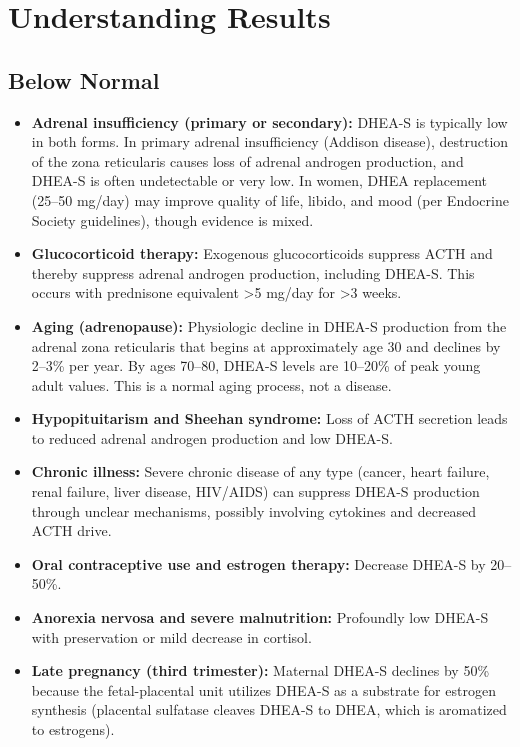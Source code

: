 \section*{Understanding Results}

\subsection*{Below Normal}
\begin{itemize}
  \item \textbf{Adrenal insufficiency (primary or secondary):} DHEA-S is typically low in both forms. In primary adrenal insufficiency (Addison disease), destruction of the zona reticularis causes loss of adrenal androgen production, and DHEA-S is often undetectable or very low. In women, DHEA replacement (25--50 mg/day) may improve quality of life, libido, and mood (per Endocrine Society guidelines), though evidence is mixed.
  \item \textbf{Glucocorticoid therapy:} Exogenous glucocorticoids suppress ACTH and thereby suppress adrenal androgen production, including DHEA-S. This occurs with prednisone equivalent >5 mg/day for >3 weeks.
  \item \textbf{Aging (adrenopause):} Physiologic decline in DHEA-S production from the adrenal zona reticularis that begins at approximately age 30 and declines by 2--3\% per year. By ages 70--80, DHEA-S levels are 10--20\% of peak young adult values. This is a normal aging process, not a disease.
  \item \textbf{Hypopituitarism and Sheehan syndrome:} Loss of ACTH secretion leads to reduced adrenal androgen production and low DHEA-S.
  \item \textbf{Chronic illness:} Severe chronic disease of any type (cancer, heart failure, renal failure, liver disease, HIV/AIDS) can suppress DHEA-S production through unclear mechanisms, possibly involving cytokines and decreased ACTH drive.
  \item \textbf{Oral contraceptive use and estrogen therapy:} Decrease DHEA-S by 20--50\%.
  \item \textbf{Anorexia nervosa and severe malnutrition:} Profoundly low DHEA-S with preservation or mild decrease in cortisol.
  \item \textbf{Late pregnancy (third trimester):} Maternal DHEA-S declines by 50\% because the fetal-placental unit utilizes DHEA-S as a substrate for estrogen synthesis (placental sulfatase cleaves DHEA-S to DHEA, which is aromatized to estrogens).
\end{itemize}


